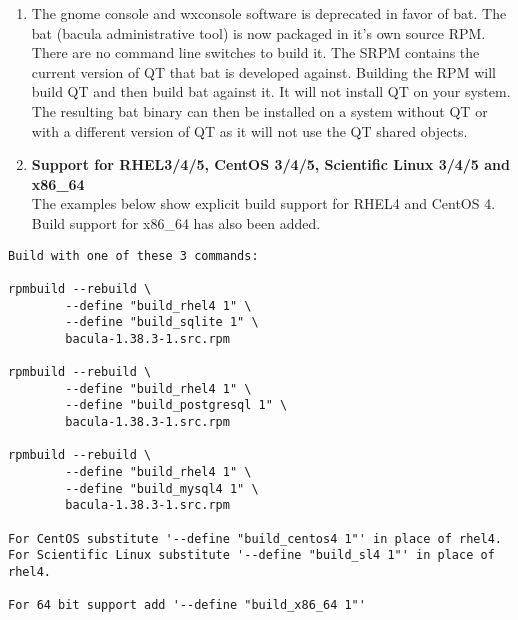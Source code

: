 \begin{enumerate}
\item 
   \label{faq10}
The gnome console and wxconsole software is deprecated in favor of bat. The 
bat (bacula administrative tool) is now packaged in it's own source RPM. There 
are no command line switches to build it. The SRPM contains the current version 
of QT that bat is developed against. Building the RPM will build QT and then build 
bat against it. It will not install QT on your system. The resulting bat binary 
can then be installed on a system without QT or with a different version of QT as it 
will not use the QT shared objects.


\item {\bf Support for RHEL3/4/5, CentOS 3/4/5, Scientific Linux 3/4/5 and x86\_64}
   \\
   The examples below show
   explicit build support for RHEL4 and CentOS 4. Build support 
   for x86\_64 has also been added. 
\end{enumerate}

\footnotesize
\begin{verbatim}
Build with one of these 3 commands:

rpmbuild --rebuild \
        --define "build_rhel4 1" \
        --define "build_sqlite 1" \
        bacula-1.38.3-1.src.rpm

rpmbuild --rebuild \
        --define "build_rhel4 1" \
        --define "build_postgresql 1" \
        bacula-1.38.3-1.src.rpm

rpmbuild --rebuild \
        --define "build_rhel4 1" \
        --define "build_mysql4 1" \
        bacula-1.38.3-1.src.rpm

For CentOS substitute '--define "build_centos4 1"' in place of rhel4. 
For Scientific Linux substitute '--define "build_sl4 1"' in place of rhel4.

For 64 bit support add '--define "build_x86_64 1"'
\end{verbatim}
\normalsize

